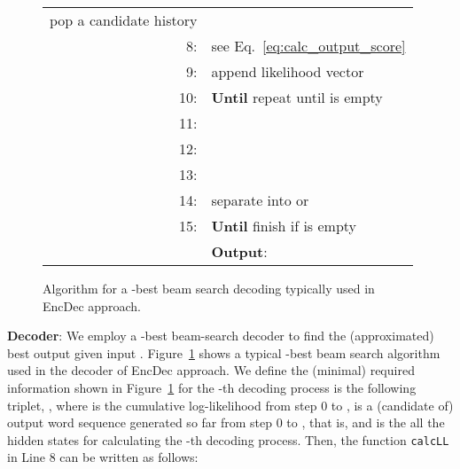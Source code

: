 \documentclass[11pt]{article}
\begin{document}
\begin{figure}[t]
\begin{tabular}{rp{71mm}}
      \hspace{\fill} {\scriptsize pop a candidate history}
      \\
  8:&\hspace{6.0mm}
      
      \hspace{\fill} {\scriptsize see Eq.~\ref{eq:calc_output_score} }
      \\
  9:&\hspace{6.0mm}
      
      \hspace{\fill} {\scriptsize append likelihood vector}
      \\
  10:&\hspace{3.0mm}
      \textbf{Until} 
      \hspace{\fill} {\scriptsize repeat until  is empty}
      \\
  11:&\hspace{3.0mm}
      
      \\
  12:&\hspace{3.0mm}
      
      \\
  13:&\hspace{3.0mm}
      
      \\
  14:&\hspace{3.0mm}
      
      \hspace{\fill} {\scriptsize separate  into  or }
      \\
  15:&\hspace{0.0em}
      \textbf{Until} 
      \hspace{\fill} {\scriptsize finish if  is empty}
      \\
\  &\hspace{-1.2em}\textbf{Output}: 
      \\
  \hline
 \end{tabular}
 \caption{Algorithm for a -best beam search decoding typically used in EncDec approach.}
 \label{fig:beam_search}
\end{figure}



{\bf Decoder}:
We employ a -best beam-search decoder to find the (approximated) best output  given input .
Figure~\ref{fig:beam_search} shows a typical -best beam search algorithm used in the decoder of EncDec approach. 
We define the (minimal) required information  shown in Figure~\ref{fig:beam_search} for the -th decoding process is the following triplet, , where
    is the cumulative log-likelihood from step 0 to ,
    is a (candidate of) output word sequence generated so far from step 0 to , that is, 
   and
    is the all the hidden states for calculating the -th decoding process.
Then, the function {\tt calcLL} in Line 8 can be written as follows:
\end{document}

